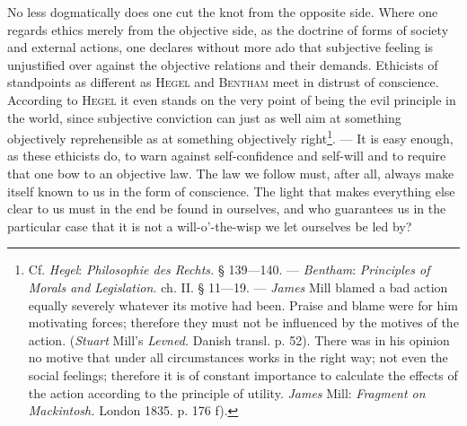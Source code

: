 \documentclass[12pt,a4paper,openany]{book}
\begin{document}
No less dogmatically does one cut the knot from the opposite side. Where one regards ethics merely from
the objective side, as the doctrine of forms of society and external actions, one declares without more
ado that subjective feeling is unjustified over against the objective relations and their demands.
Ethicists of standpoints as different as \textsc{Hegel} and \textsc{Bentham} meet in distrust of
conscience. According to \textsc{Hegel} it even stands on the very point of being the evil principle in
the world, since subjective conviction can just as well aim at something objectively reprehensible as at
something objectively right\footnote[1]{Cf. \emph{Hegel}: \textit{Philosophie des Rechts.} § 139---140. ---
\emph{Bentham}: \textit{Principles of Morals and Legislation.} ch. II. § 11---19. --- \emph{James} Mill
blamed a bad action equally severely whatever its motive had been. Praise and blame were for him
motivating forces; therefore they must not be influenced by the motives of the action. (\emph{Stuart}
Mill's \textit{Levned.} Danish transl. p. 52). There was in his opinion no motive that under all
circumstances works in the right way; not even the social feelings; therefore it is of constant
importance to calculate the effects of the action according to the principle of utility. \emph{James}
Mill: \textit{Fragment on Mackintosh.} London 1835. p. 176 f).}. --- It is easy enough, as these
ethicists do, to warn against self-confidence and self-will and to require that one bow to an objective
law. The law we follow must, after all, always make itself known to us in the form of conscience. The
light that makes everything else clear to us must in the end be found in ourselves, and who guarantees
us in the particular case that it is not a will-o'-the-wisp we let ourselves be led by?
\end{document}
